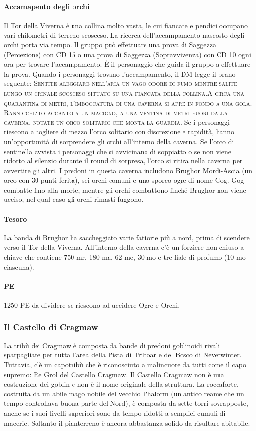 \documentclass{article}
\begin{document}
\paragraph{Accamapento degli orchi}
Il Tor della Viverna è una collina molto vasta, le cui
fiancate e pendici occupano vari chilometri di terreno scosceso. La ricerca dell’accampamento nascosto degli
orchi porta via tempo. Il gruppo può effettuare una prova
di Saggezza (Percezione) con CD 15 o una prova di
Saggezza (Sopravvivenza) con CD 10 ogni ora per trovare
l'accampamento. È il personaggio che guida il gruppo a
effettuare la prova.
Quando i personaggi trovano l'accampamento, il DM legge
il brano seguente: \textsc{Sentite aleggiare nell’aria un vago odore di fumo mentre
salite lungo un crinale scosceso situato su una fiancata della
collina.A circa una quarantina di metri, l’imboccatura di una
caverna si apre in fondo a una gola. Rannicchiato accanto a un
macigno, a una ventina di metri fuori dalla caverna, notate un
orco solitario che monta la guardia.} 
Se i personaggi riescono a togliere di mezzo l'orco solitario
con discrezione e rapidità, hanno un'opportunità di
sorprendere gli orchi all'interno della caverna. Se l'orco di
sentinella avvista i personaggi che si avvicinano di soppiatto
o se non viene ridotto al silenzio durante il round di sorpresa,
l’orco si ritira nella caverna per avvertire gli altri.
I predoni in questa caverna includono Brughor Mordi-Ascia
(un orco con 30 punti ferita), sei orchi comuni e uno sporco
ogre di nome Gog. Gog combatte fino alla morte, mentre gli
orchi combattono finché Brughor non viene ucciso, nel qual
caso gli orchi rimasti fuggono.

\paragraph{Tesoro} La banda di Brughor ha saccheggiato varie fattorie più a
nord, prima di scendere verso il Tor della Viverna. All'interno
della caverna c'è un forziere non chiuso a chiave che contiene
750 mr, 180 ma, 62 me, 30 mo e tre fiale di profumo (10
mo ciascuna).

\paragraph{PE} 1250 PE da dividere se riescono ad uccidere Ogre e Orchi.

\subsubsection{Il Castello di Cragmaw}
La tribù dei Cragmaw è composta da bande di predoni
goblinoidi rivali sparpagliate per tutta l’area della Pista di
Triboar e del Bosco di Neverwinter. Tuttavia, c'è un capotribù
che è riconosciuto a malincuore da tutti come il capo
supremo: Re Grol del Castello Cragmaw.
Il Castello Cragmaw non è una costruzione dei goblin e non
è il nome originale della struttura. La roccaforte, costruita
da un abile mago nobile del vecchio Phalorm (un antico
reame che un tempo controllava buona parte del Nord), è
composta da sette torri sovrapposte, anche se i suoi livelli
superiori sono da tempo ridotti a semplici cumuli di macerie.
Soltanto il pianterreno è ancora abbastanza solido da
risultare abitabile.
\end{document}
